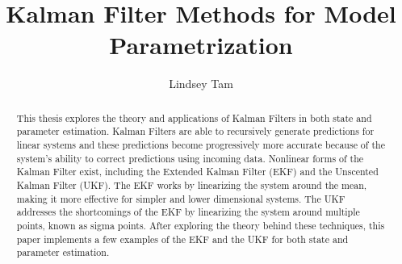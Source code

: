 \documentclass{pom_thesis}
\title{Kalman Filter Methods for Model Parametrization}\par
\author{Lindsey Tam }
\begin{document}
\maketitle

\begin{abstract}
	This thesis explores the theory and applications of Kalman Filters in both state and parameter estimation. Kalman Filters are able to recursively generate predictions for linear systems and these predictions become progressively more accurate because of the system's ability to correct predictions using incoming data. Nonlinear forms of the Kalman Filter exist, including the Extended Kalman Filter (EKF) and the Unscented Kalman Filter (UKF). The EKF works by linearizing the system around the mean, making it more effective for simpler and lower dimensional systems. The UKF addresses the shortcomings of the EKF by linearizing the system around multiple points, known as sigma points. After exploring the theory behind these techniques, this paper implements a few examples of the EKF and the UKF for both state and parameter estimation. \end{abstract}

\tableofcontents























\appendix

\end{document}
